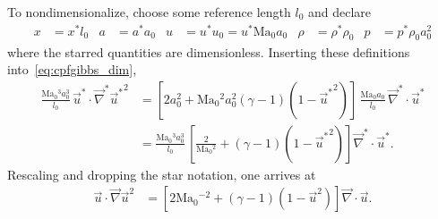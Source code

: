 \documentclass[letterpaper,11pt,nointlimits,reqno]{amsart}
\newcommand{\Mach}[1][]{\mbox{Ma}_{#1}}
\begin{document}
To nondimensionalize, choose some reference length $l_0$ and declare
\begin{align}
    x     &= x^\ast l_0
&   a     &= a^\ast a_0
&   u     &= u^\ast u_0 = u^\ast \Mach[0] a_0
&   \rho  &= \rho^\ast \rho_0
&   p     &= p^\ast \rho_0 a_0^2
\label{eq:nondimensionalization}
\end{align}
where the starred quantities are dimensionless.  Inserting these definitions
into~\eqref{eq:cpfgibbs_dim},
\begin{align}
       \frac{\Mach[0]{}^3 a_0^3}{l_0}
       \,
       \vec{u}^\ast \cdot \vec{\nabla}^\ast{\vec{u}^\ast}^2
    &=
       \left[
          2 a_0^2
        + \Mach[0]{}^2 a_0^2
          \left(\gamma-1\right)
          \left(1 - {\vec{u}^\ast}^2\right)
       \right]
       \,
       \frac{\Mach[0]{} a_0}{l_0}
       \,
       \vec{\nabla}^\ast\cdot\vec{u}^\ast
\\
    &=
       \frac{\Mach[0]{}^3 a_0^3}{l_0}
       \,
       \left[
          \frac{2}{\Mach[0]{}^2}
        + \left(\gamma-1\right) \left(1 - {\vec{u}^\ast}^2\right)
       \right]
       \vec{\nabla}^\ast\cdot\vec{u}^\ast
.
\end{align}
Rescaling and dropping the star notation, one arrives at
\begin{align}
       \vec{u} \cdot \vec{\nabla}\vec{u}^2
    &=
       \left[
          2 \Mach[0]{}^{-2}
        + \left(\gamma-1\right) \left(1 - \vec{u}^2\right)
       \right]
       \vec{\nabla}\cdot\vec{u}
\label{eq:cpfgibbs_nondim}
.
\end{align}
\end{document}
